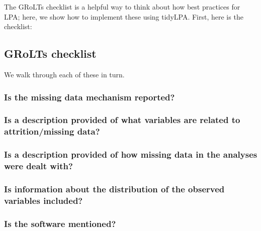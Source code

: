 \documentclass[man]{apa6}
\begin{document}
The GRoLTs checklist is a helpful way to think about how best practices for LPA;
here, we show how to implement these using tidyLPA. First, here is the checklist:

\hypertarget{grolts-checklist}{%
\subsection{GRoLTs checklist}\label{grolts-checklist}}

\hypertarget{htmlwidget-6725a3bb4d9d4a47b614}{}

We walk through each of these in turn.

\hypertarget{is-the-missing-data-mechanism-reported}{%
\subsubsection{Is the missing data mechanism reported?}\label{is-the-missing-data-mechanism-reported}}

\hypertarget{is-a-description-provided-of-what-variables-are-related-to-attritionmissing-data}{%
\subsubsection{Is a description provided of what variables are related to attrition/missing data?}\label{is-a-description-provided-of-what-variables-are-related-to-attritionmissing-data}}

\hypertarget{is-a-description-provided-of-how-missing-data-in-the-analyses-were-dealt-with}{%
\subsubsection{Is a description provided of how missing data in the analyses were dealt with?}\label{is-a-description-provided-of-how-missing-data-in-the-analyses-were-dealt-with}}

\hypertarget{is-information-about-the-distribution-of-the-observed-variables-included}{%
\subsubsection{Is information about the distribution of the observed variables included?}\label{is-information-about-the-distribution-of-the-observed-variables-included}}

\hypertarget{is-the-software-mentioned}{%
\subsubsection{Is the software mentioned?}\label{is-the-software-mentioned}}
\end{document}
